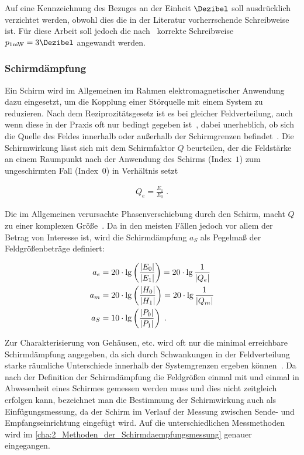 Auf eine Kennzeichnung des Bezuges an der Einheit $\si{\Dezibel}$ soll ausdrücklich verzichtet werden, obwohl dies die in der Literatur vorherrschende Schreibweise ist. Für diese Arbeit soll jedoch die nach~\cite{IEC60027-3} korrekte Schreibweise $p_{1 \si{\milli\watt}} = 3 \si{\Dezibel}$ angewandt werden. 


\subsubsection{Schirmdämpfung}\label{cha:2_subsub_Schirmdaempfung}

Ein Schirm wird im Allgemeinen im Rahmen elektromagnetischer Anwendung dazu eingesetzt, um die Kopplung einer Störquelle mit einem System zu reduzieren. Nach dem Reziprozitätsgesetz ist es bei gleicher Feldverteilung, auch wenn diese in der Praxis oft nur bedingt gegeben ist~\cite{EMV-gerechtes_Geraetedesign}, dabei unerheblich, ob sich die Quelle des Feldes innerhalb oder außerhalb der Schirmgrenzen befindet~\cite{EM_Schirmung}. Die Schirmwirkung lässt sich mit dem Schirmfaktor $Q$ beurteilen, der die Feldstärke an einem Raumpunkt nach der Anwendung des Schirms (Index~\glqq$1$\grqq) zum ungeschirmten Fall (Index~\glqq$0$\grqq) in Verhältnis setzt~\cite{EM_Schirmung}

\begin{align}
    Q_e = \frac{E_1}{E_0} \; \text{.}
\end{align}

\par
\vspace{\linespace}
Die im Allgemeinen verursachte Phasenverschiebung durch den Schirm, macht $Q$ zu einer komplexen Größe~\cite{EM_Schirmung}. Da in den meisten Fällen jedoch vor allem der Betrag von Interesse ist, wird die Schirmdämpfung $a_S$ als Pegelmaß der Feldgrößenbeträge definiert:

\begin{align}
    a_e &= 20 \cdot \lg \left(\frac{\lvert E_0\rvert}{\lvert E_1\rvert}\right) = 20 \cdot \lg \frac{1}{\lvert Q_e\rvert} \\
    a_m &= 20 \cdot \lg \left(\frac{\lvert H_0\rvert}{\lvert H_1\rvert}\right) = 20 \cdot \lg \frac{1}{\lvert Q_m\rvert} \\
    a_S &= 10 \cdot \lg \left(\frac{\lvert P_0\rvert}{\lvert P_1\rvert}\right) \; \text{.}
\end{align}

Zur Charakterisierung von Gehäusen, etc. wird oft nur die minimal erreichbare Schirmdämpfung angegeben, da sich durch Schwankungen in der Feldverteilung starke räumliche Unterschiede innerhalb der Systemgrenzen ergeben können~\cite{EM_Schirmung}. Da nach der Definition der Schirmdämpfung die Feldgrößen einmal mit und einmal in Abwesenheit eines Schirmes gemessen werden muss und dies nicht zeitgleich erfolgen kann, bezeichnet man die Bestimmung der Schirmwirkung auch als Einfügungsmessung, da der Schirm im Verlauf der Messung zwischen Sende- und Empfangseinrichtung eingefügt wird. Auf die unterschiedlichen Messmethoden wird im \Abschnitt\ref{cha:2_Methoden_der_Schirmdaempfungsmessung} genauer eingegangen.


